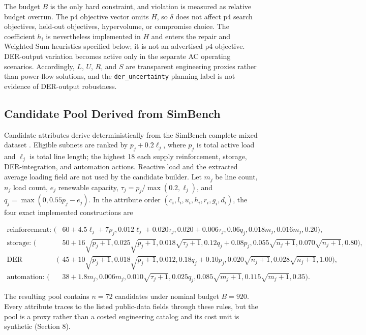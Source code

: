 \documentclass[energies,article,submit,moreauthors]{Definitions/mdpi}
\begin{document}
The budget \(B\) is the only hard constraint, and violation is measured as relative budget overrun. The p4 objective vector omits \(H\), so \(\delta\) does not affect p4 search objectives, held-out objectives, hypervolume, or compromise choice. The coefficient \(h_i\) is nevertheless implemented in \(H\) and enters the repair and Weighted Sum heuristics specified below; it is not an advertised p4 objective. DER-output variation becomes active only in the separate AC operating scenarios. Accordingly, \(L\), \(U\), \(R\), and \(S\) are transparent engineering proxies rather than power-flow solutions, and the \texttt{der\_uncertainty} planning label is not evidence of DER-output robustness.

\subsection{Candidate Pool Derived from SimBench}\label{candidate-pool-derived-from-simbench}

Candidate attributes derive deterministically from the SimBench complete mixed dataset \cite{ref7}. Eligible subnets are ranked by \(p_j+0.2\ell_j\), where \(p_j\) is total active load and \(\ell_j\) is total line length; the highest 18 each supply reinforcement, storage, DER-integration, and automation actions. Reactive load and the extracted average loading field are not used by the candidate builder. Let \(m_j\) be line count, \(n_j\) load count, \(e_j\) renewable capacity, \(\tau_j=p_j/\max(0.2,\ell_j)\), and \(q_j=\max(0,0.55p_j-e_j)\). In the attribute order \((c_i,l_i,u_i,h_i,r_i,g_i,d_i)\), the four exact implemented constructions are

\[
\begin{aligned}
\text{reinforcement: }(&60+4.5\ell_j+7p_j,
0.012\ell_j+0.020\tau_j,
0.020+0.006\tau_j,
0.06q_j,
0.018m_j,
0.016m_j,
0.20),\\
\text{storage: }(&50+16\sqrt{p_j+1},
0.025\sqrt{p_j+1},
0.018\sqrt{\tau_j+1},
0.12q_j+0.08p_j,
0.055\sqrt{n_j+1},
0.070\sqrt{n_j+1},
0.80),\\
\text{DER integration: }(&45+10\sqrt{p_j+1},
0.018\sqrt{p_j+1},
0.012,
0.18q_j+0.10p_j,
0.020\sqrt{n_j+1},
0.028\sqrt{n_j+1},
1.00),\\
\text{automation: }(&38+1.8m_j,
0.006m_j,
0.010\sqrt{\tau_j+1},
0.025q_j,
0.085\sqrt{m_j+1},
0.115\sqrt{m_j+1},
0.35).
\end{aligned}
\]

The resulting pool contains \(n=72\) candidates under nominal budget \(B=920\). Every attribute traces to the listed public-data fields through these rules, but the pool is a proxy rather than a costed engineering catalog and its cost unit is synthetic (Section 8).
\end{document}

